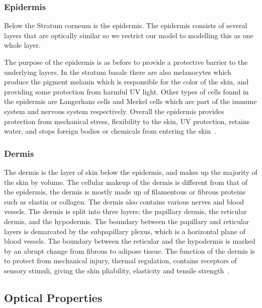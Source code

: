 
\subsubsection*{Epidermis} %
\label{ssub:epidermis}

Below the Stratum corneum is the epidermis.
The epidermis consists of several layers that are optically similar so we restrict our model to modelling this as one whole layer.

The purpose of the epidermis is as before to provide a protective barrier to the underlying layers. 
In the stratum basale there are also melanocytes which produce the pigment melanin which is responsible for the color of the skin, and providing some protection from harmful UV light. 
Other types of cells found in the epidermis are Langerhans cells and Merkel cells which are part of the immune system and nervous system respectively.
Overall the epidermis provides protection from mechanical stress, flexibility to the skin, UV protection, retains water, and stops foreign bodies or chemicals from entering the skin~\cite{freedberg1999fitzpatrick,zaidi2010dermatology}.


\subsubsection*{Dermis} %
\label{sub:dermis}
The dermis is the layer of skin below the epidermis, and makes up the majority of the skin by volume.
The cellular makeup of the dermis is different from that of the epidermis, the dermis is mostly made up of filamentous or fibrous proteins such as elastin or collagen.
The dermis also contains various nerves and blood vessels.
The dermis is split into three layers; the papillary dermis, the reticular dermis, and the hypodermis.
The boundary between the papillary and reticular layers is demarcated by the subpapillary plexus, which is a horizontal plane of blood vessels.
The boundary between the reticular and the hypodermis is marked by an abrupt change from fibrous to adipose tissue.
The function of the dermis is to protect from mechanical injury, thermal regulation, contains receptors of sensory stimuli, giving the skin pliability, elasticity and tensile strength~\cite{freedberg1999fitzpatrick,zaidi2010dermatology}.
 


\subsection{Optical Properties} %
\label{sub:optical_properties}


